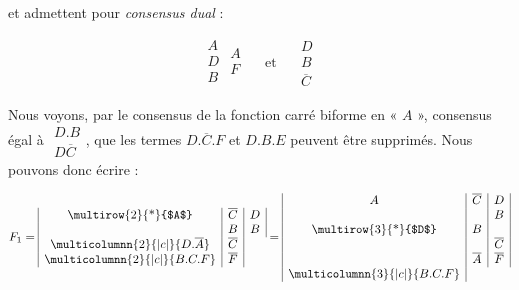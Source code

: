 et admettent pour \emph{consensus dual} : 

\[ \begin{array}{|c|} 
	A \\ D \\ B \\ 
\end{array} 
      \begin{array}{c|} 
           A \\ F \\ 
      \end{array}   
            \quad \text{ et } \quad 
                  \begin{array}{|c|} D \\ B \\ \overline{C} \end{array} \]

Nous voyons, par le consensus de la fonction carré biforme en « $A$ », consensus égal à $ \begin{array}{|c|} D . B \\ D \overline{C} \end{array}$, que les termes $ D . \overline{C} . F$ et $ D . B  . E $ peuvent être supprimés. Nous pouvons donc écrire : 

 
\[ 
F_1 = \begin{array}{|c|c|c|} 
            $\multirow{2}{*}{$A$}$ & \overline{C} & D \\
                                   &   B          & B \\
\multicolumnn{2}{|c|}{D . \overline{A}} & \overline{C} \\
\multicolumnn{2}{|c|}{B . C . F }   & \overline{F} \\  
             \end{array} 
             = 
           \begin{array}{|c|c|c|} 
                     A & \overline{C} & D \\                    
                      &              & B  \\
                    $\multirow{3}{*}{$D$}$    &       B        &   \\
                     	  &  & \overline{C}  \\
                     	  & \overline{A} & \overline{F}  \\
\multicolumnn{3}{|c|}{B . C . F }  \\	  
          	\end{array}                          
\]


